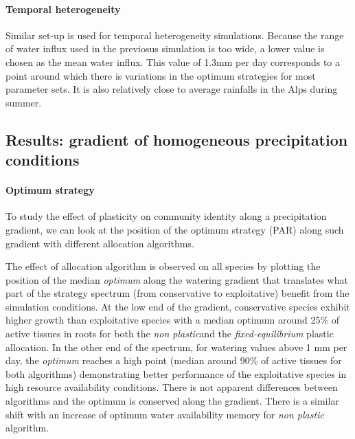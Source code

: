 \paragraph{Temporal heterogeneity}
Similar set-up is used for temporal heterogeneity simulations. Because the range of water influx used in the previosus simulation is too wide, a lower value is chosen as the mean water influx. This value of 1.3mm per day corresponds to a point around which there is variations in the optimum strategies for most parameter sets. It is also relatively close to average rainfalls in the Alps during summer. 

\subsection{Results: gradient of homogeneous precipitation conditions}

\paragraph{Optimum strategy}

To study the effect of plasticity on community identity along a precipitation gradient, we can look at the position of the optimum strategy (PAR) along such gradient with different allocation algorithms.


The effect of allocation algorithm is observed on all species by plotting the position of the median \textit{optimum} along the watering gradient that translates what part of the strategy spectrum (from conservative to exploitative) benefit from the simulation conditions. At the low end of the gradient, conservative species exhibit higher growth than exploitative species with a median optimum around 25\% of active tissues in roots for both the \textit{non plastic}and the \textit{fixed-equilibrium} plastic allocation. In the other end of the spectrum, for watering values above 1 mm per day, the \textit{optimum} reaches a high point (median around 90\% of active tissues for both algorithms) demonstrating better performance of the exploitative species in high resource availability conditions.  There is not apparent differences between algorithms and the optimum is conserved along the gradient. There is a similar shift with an increase of optimum water availability memory for \textit{non plastic} algorithm.


